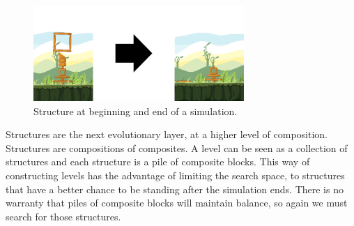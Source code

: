 \documentclass[conference]{IEEEtran}
\begin{document}
    
    

    
    \begin{figure}[htbp]
    \centerline{\includegraphics[width=80mm]{Images/simulation_bef_aft_example.png}}
    \caption{Structure at beginning and end of a simulation.}
    \label{test_old}
    \end{figure}
    
    Structures are the next evolutionary layer, at a higher level of composition.
    Structures are compositions of composites. A level can be seen as a collection 
    of structures and each structure is a pile of composite blocks. This way of 
    constructing levels has the advantage of
    limiting the search space, to structures that have a better chance to be 
    standing after the simulation ends. There is no warranty that piles of 
    composite blocks will maintain balance, so again we must search for those 
    structures.
\end{document}
